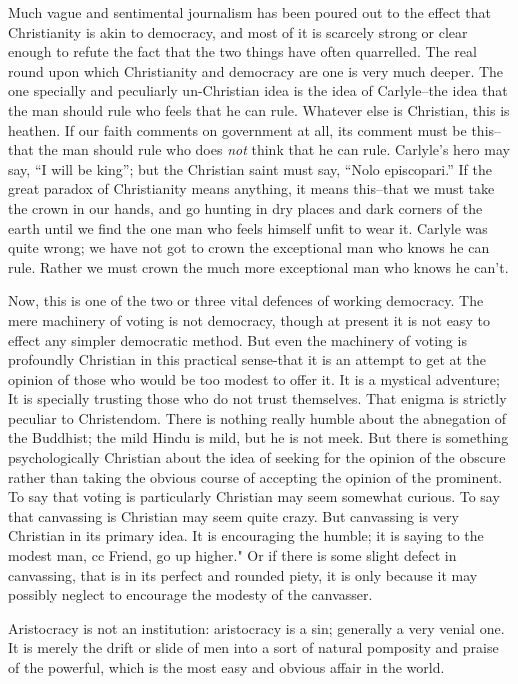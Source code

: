 \documentclass{book}
\begin{document}
Much vague and sentimental journalism has been poured out to the effect that Christianity is akin to democracy, and most of it is scarcely strong or clear enough to refute the fact that the two things have often quarrelled. The real round upon which Christianity and democracy are one is very much deeper. The one specially and peculiarly un-Christian idea is the idea of Carlyle–the idea that the man should rule who feels that he can rule. Whatever else is Christian, this is heathen. If our faith comments on government at all, its comment must be this–that the man should rule who does \emph{not} think that he can rule. Carlyle’s hero may say, “I will be king”; but the Christian saint must say, “Nolo episcopari.” If the great paradox of Christianity means anything, it means this–that we must take the crown in our hands, and go hunting in dry places and dark corners of the earth until we find the one man who feels himself unfit to wear it. Carlyle was quite wrong; we have not got to crown the exceptional man who knows he can rule. Rather we must crown the much more exceptional man who knows he can’t.

Now, this is one of the two or three vital defences of working democracy. The mere machinery of voting is not democracy, though at present it is not easy to effect any simpler democratic method. But even the machinery of voting is profoundly Christian in this practical sense-that it is an attempt to get at the opinion of those who would be too modest to offer it. It is a mystical adventure; It is specially trusting those who do not trust themselves. That enigma is strictly peculiar to Christendom. There is nothing really humble about the abnegation of the Buddhist; the mild Hindu is mild, but he is not meek. But there is something psychologically Christian about the idea of seeking for the opinion of the obscure rather than taking the obvious course of accepting the opinion of the prominent. To say that voting is particularly Christian may seem somewhat curious. To say that canvassing is Christian may seem quite crazy. But canvassing is very Christian in its primary idea. It is encouraging the humble; it is saying to the modest man, cc Friend, go up higher." Or if there is some slight defect in canvassing, that is in its perfect and rounded piety, it is only because it may possibly neglect to encourage the modesty of the canvasser.

Aristocracy is not an institution: aristocracy is a sin; generally a very venial one. It is merely the drift or slide of men into a sort of natural pomposity and praise of the powerful, which is the most easy and obvious affair in the world.
\end{document}
